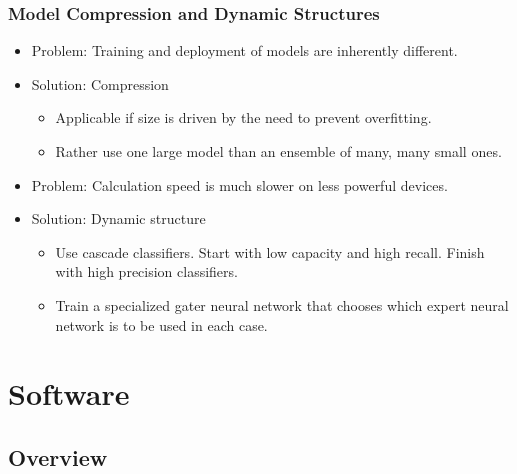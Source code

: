 \documentclass[9pt]{beamer}
\begin{document}
\begin{frame}
\frametitle{Model Compression and Dynamic Structures}
\begin{itemize}
\item Problem: Training and deployment of models are inherently different.
\item Solution: Compression
\begin{itemize}
\item Applicable if size is driven by the need to prevent overfitting.
\item Rather use one large model than an ensemble of many, many small ones.
\end{itemize}
\item Problem: Calculation speed is much slower on less powerful devices.
\item Solution: Dynamic structure
\begin{itemize}

\item Use cascade classifiers. Start with low capacity and high recall. Finish with high precision classifiers.
\item Train a specialized gater neural network that chooses which expert neural network is to be used in each case.
\end{itemize}
\end{itemize}
\end{frame}

\section{Software}

\subsection{Overview}
\end{document}
